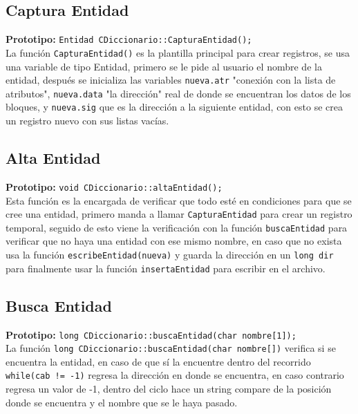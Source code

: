 \documentclass[12pt]{article}
\begin{document}
{}
\subsection*{Captura Entidad}
\textbf{Prototipo:} \verb|Entidad CDiccionario::CapturaEntidad();|\\
La función \verb|CapturaEntidad()| es la plantilla principal para crear registros, se usa
una variable de tipo Entidad, primero se le pide al usuario el nombre de la entidad, después
se inicializa las variables \texttt{nueva.atr} "conexión con la lista de atributos", \texttt{nueva.data} "la dirección"
real de donde se encuentran los datos de los bloques, y \texttt{nueva.sig} que es la dirección a la
siguiente entidad, con esto se crea un registro nuevo con sus listas vacías.

{}
\subsection*{Alta Entidad}
\textbf{Prototipo:} \verb|void CDiccionario::altaEntidad();|\\
Esta función es la encargada de verificar que todo esté en condiciones para que se cree una entidad,
primero manda a llamar \verb|CapturaEntidad| para crear un registro temporal, seguido de esto
viene la verificación con la función \verb|buscaEntidad| para verificar que no haya una entidad con
ese mismo nombre, en caso que no exista usa la función \verb|escribeEntidad(nueva)| y guarda la dirección
en un \verb|long dir| para finalmente usar la función \verb|insertaEntidad| para escribir en el archivo.

{}
\subsection*{Busca Entidad}
\textbf{Prototipo:} \verb|long CDiccionario::buscaEntidad(char nombre[1]);|\\
La función \verb|long CDiccionario::buscaEntidad(char nombre[])| verifica si se encuentra la entidad,
en caso de que sí la encuentre dentro del recorrido \verb|while(cab != -1)| regresa la dirección
en donde se encuentra, en caso contrario regresa un valor de -1, dentro del ciclo hace un string compare
de la posición donde se encuentra y el nombre que se le haya pasado.

\newpage
\end{document}
